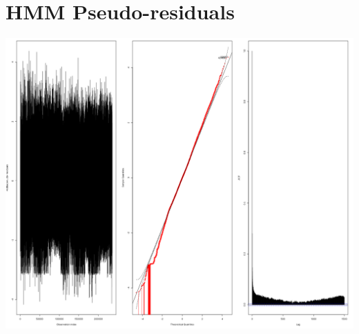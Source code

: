 \documentclass[english,msc,numbers,hidelinks]{coppe}
\begin{document}
  \hypertarget{hmm-pseudo-residuals}{%
  \chapter{HMM Pseudo-residuals}\label{hmm-pseudo-residuals}}
  \begin{center}\includegraphics[width=1\linewidth]{../04_figures/residuals/m2_PR} \end{center}
\end{document}
